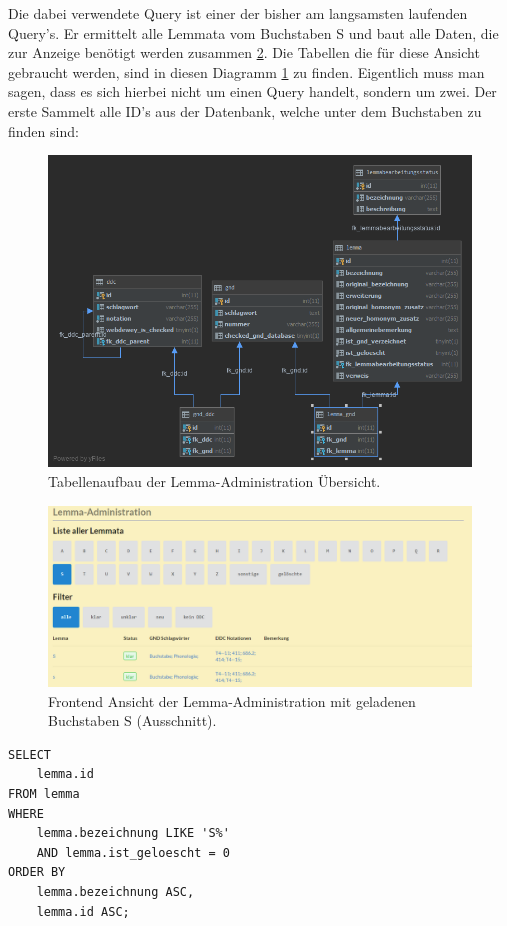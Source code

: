 Die dabei verwendete Query ist einer der bisher am langsamsten laufenden Query’s. Er ermittelt alle Lemmata vom Buchstaben S und baut alle Daten, die zur Anzeige benötigt werden zusammen \ref{img:lAdminSample}. Die Tabellen die für diese Ansicht gebraucht werden, sind in diesen Diagramm \ref{img:lAdminStructure} zu finden. Eigentlich muss man sagen, dass es sich hierbei nicht um einen Query handelt, sondern um zwei. Der erste Sammelt alle ID’s aus der Datenbank, welche unter dem Buchstaben zu finden sind:

\begin{figure}
	\centering
	\includegraphics[width=0.8\linewidth]{images/structure_lemmaadministration.png}
	\caption{Tabellenaufbau der Lemma-Administration Übersicht.}
	\label{img:lAdminStructure}
\end{figure}

\begin{figure}
	\centering
	\includegraphics[width=1\linewidth]{images/lemmaadministration_sample.PNG}
	\caption{Frontend Ansicht der Lemma-Administration mit geladenen Buchstaben S (Ausschnitt).}
	\label{img:lAdminSample}
\end{figure}

\lstset{language=SQL}
\begin{lstlisting}[frame=single] 
    SELECT
    lemma.id
FROM lemma
WHERE
    lemma.bezeichnung LIKE 'S%'
    AND lemma.ist_geloescht = 0
ORDER BY
    lemma.bezeichnung ASC,
    lemma.id ASC;
\end{lstlisting}

